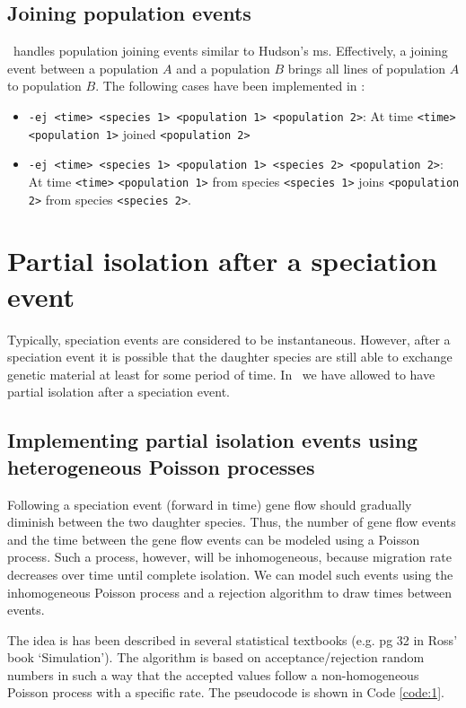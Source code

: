 \subsection{Joining population events}
\comus\ handles population joining events similar to Hudson's ms. Effectively, a joining event between a population $A$ and a population $B$ brings all lines of population $A$ to population $B$. The following cases have been implemented in \comus:

\begin{itemize}
\item \verb!-ej <time> <species 1> <population 1> <population 2>!: At time \verb!<time>! \\
\verb!<population 1>! joined \verb!<population 2>!
\item \verb!-ej <time> <species 1> <population 1> <species 2> <population 2>!: At time \verb!<time>! \verb!<population 1>! from species \verb!<species 1>! joins \verb!<population 2>! from species \verb!<species 2>!. 
\end{itemize}


\section{Partial isolation after a speciation event}
Typically, speciation events are considered to be instantaneous. However, after a speciation event it is possible that the daughter species are still able to exchange genetic material at least for some period of time. In \comus\ we have allowed to have partial isolation after a speciation event. 

\subsection{Implementing partial isolation events using heterogeneous Poisson processes}
Following a speciation event (forward in time) gene flow should gradually diminish between the two daughter species. Thus, the number of gene flow events and the time between the gene flow events can be modeled using a Poisson process. Such a process, however, will be inhomogeneous, because migration rate decreases over time until complete isolation. We can model such events using the inhomogeneous Poisson process and a rejection algorithm to draw times between events. 

The idea is has been described in several statistical textbooks (e.g. pg 32 in Ross' book `Simulation'). The algorithm is based on acceptance/rejection random numbers in such a way that the accepted values follow a non-homogeneous Poisson process with a specific rate. The pseudocode is shown in Code \ref{code:1}.

